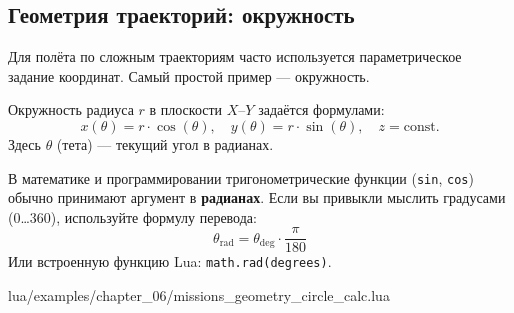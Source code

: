 \subsection{Геометрия траекторий: окружность}

Для полёта по сложным траекториям часто используется параметрическое задание координат. Самый простой пример — окружность.

Окружность радиуса \(r\) в плоскости \(X\)–\(Y\) задаётся формулами:
\[
  x(\theta) = r \cdot \cos(\theta),\quad y(\theta) = r \cdot \sin(\theta),\quad z = \text{const}.
\]
Здесь \(\theta\) (тета) — текущий угол в радианах.

\begin{infobox}
В математике и программировании тригонометрические функции (\texttt{sin}, \texttt{cos}) обычно принимают аргумент в \textbf{радианах}.
Если вы привыкли мыслить градусами (0\dots360), используйте формулу перевода:
\[
  \theta_{\mathrm{rad}} = \theta_{\mathrm{deg}} \cdot \frac{\pi}{180}
\]
Или встроенную функцию Lua: \texttt{math.rad(degrees)}.
\end{infobox}

\begin{codebox}
\begin{codefile}{lua/examples/chapter_06/missions_geometry_circle_calc.lua}
\end{codefile}
\end{codebox}
